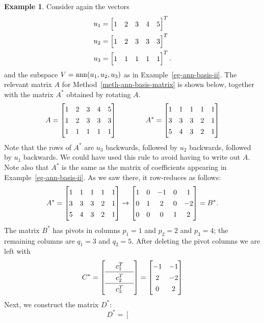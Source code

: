 \documentclass[reqno]{amsart}
\theoremstyle{definition}
\newtheorem{example}[theorem]{Example}
\begin{document}
\begin{example}\label{eg-ann-basis-matrix-ii}
 Consider again the vectors
 \begin{align*}
  u_1 &= \bbm 1 & 2 & 3 & 4 & 5 \ebm^T \\
  u_2 &= \bbm 1 & 2 & 3 & 3 & 3 \ebm^T \\
  u_3 &= \bbm 1 & 1 & 1 & 1 & 1 \ebm^T.
 \end{align*}
 and the subspace $V=\operatorname{ann}(u_1,u_2,u_3)$ as in
 Example~\ref{eg-ann-basis-ii}.  The relevant matrix $A$ for
 Method~\ref{meth-ann-basis-matrix} is shown below, together with the matrix
 $A^*$ obtained by rotating $A$.
 \[ A = \bbm
      1 & 2 & 3 & 4 & 5 \\
      1 & 2 & 3 & 3 & 3 \\
      1 & 1 & 1 & 1 & 1
    \ebm \hspace{4em}
    A^* = \bbm
      1 & 1 & 1 & 1 & 1 \\
      3 & 3 & 3 & 2 & 1 \\
      5 & 4 & 3 & 2 & 1
    \ebm
 \]
 Note that the rows of $A^*$ are $u_3$ backwards, followed by $u_2$
 backwards, followed by $u_1$ backwards.  We could have used this rule
 to avoid having to write out $A$.  Note also that $A^*$ is the same
 as the matrix of coefficients appearing in
 Example~\ref{eg-ann-basis-ii}.  As we saw there, it row-reduces as
 follows:
 \[ A^* =
    \bbm
      1 & 1 & 1 & 1 & 1 \\
      3 & 3 & 3 & 2 & 1 \\
      5 & 4 & 3 & 2 & 1
    \ebm
    \to
    \bbm
      1 & 0 &-1 & 0 & 1 \\
      0 & 1 & 2 & 0 &-2 \\
      0 & 0 & 0 & 1 & 2
    \ebm
   = B^*.
 \]
 The matrix $B^*$ has pivots in columns $p_1=1$ and
 $p_2=2$ and $p_3=4$; the remaining columns are $q_1=3$ and $q_2=5$.
 After deleting the pivot columns we are left with
 \[ C^* = {\renewcommand{\arraystretch}{1.3}
      \left[\begin{array}{ccc}
        & c_1^T & \\ \hline
        & c_2^T & \\ \hline
        & c_3^T &
      \end{array}\right]}
      = \bbm -1 & -1 \\
              2 & -2 \\
              0 &  2 \ebm
 \]
  Next, we construct the matrix $D^*$:
  \[ D^* =
      \left[\begin{array}{c|c|c|c|c}
        &&&& \\

\end{array}\]
\end{example}
\end{document}
